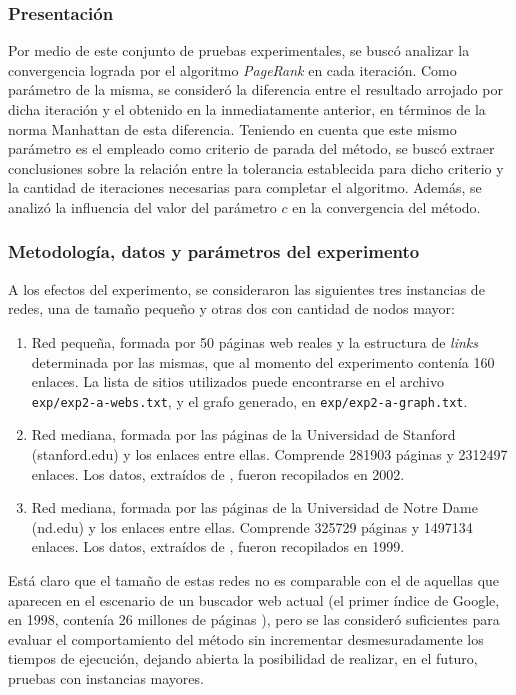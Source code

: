             \subsubsection*{Presentación}
            Por medio de este conjunto de pruebas experimentales, se buscó analizar la convergencia lograda por el algoritmo \emph{PageRank} en cada iteración. Como parámetro de la misma, se consideró la diferencia entre el resultado arrojado por dicha iteración y el obtenido en la inmediatamente anterior, en términos de la norma Manhattan de esta diferencia. Teniendo en cuenta que este mismo parámetro es el empleado como criterio de parada del método, se buscó extraer conclusiones sobre la relación entre la tolerancia establecida para dicho criterio y la cantidad de iteraciones necesarias para completar el algoritmo. Además, se analizó la influencia del valor del parámetro $c$ en la convergencia del método.

            \subsubsection*{Metodología, datos y parámetros del experimento}
            A los efectos del experimento, se consideraron las siguientes tres instancias de redes, una de tamaño pequeño y otras dos con cantidad de nodos mayor:
            \begin{enumerate}[label=(\alph*)]
                \item Red pequeña, formada por 50 páginas web reales y la estructura de \emph{links} determinada por las mismas, que al momento del experimento contenía 160 enlaces. La lista de sitios utilizados puede encontrarse en el archivo \texttt{exp/exp2-a-webs.txt}, y el grafo generado, en \texttt{exp/exp2-a-graph.txt}.

                \item Red mediana, formada por las páginas de la Universidad de Stanford (stanford.edu) y los enlaces entre ellas. Comprende 281903 páginas y 2312497 enlaces. Los datos, extraídos de \cite{SNAP}, fueron recopilados en 2002.

                \item Red mediana, formada por las páginas de la Universidad de Notre Dame (nd.edu) y los enlaces entre ellas. Comprende 325729 páginas y 1497134 enlaces. Los datos, extraídos de \cite{SNAP}, fueron recopilados en 1999.
            \end{enumerate}

            Está claro que el tamaño de estas redes no es comparable con el de aquellas que aparecen en el escenario de un buscador web actual (el primer índice de Google, en 1998, contenía 26 millones de páginas \cite{Brin1998}), pero se las consideró suficientes para evaluar el comportamiento del método sin incrementar desmesuradamente los tiempos de ejecución, dejando abierta la posibilidad de realizar, en el futuro, pruebas con instancias mayores.

